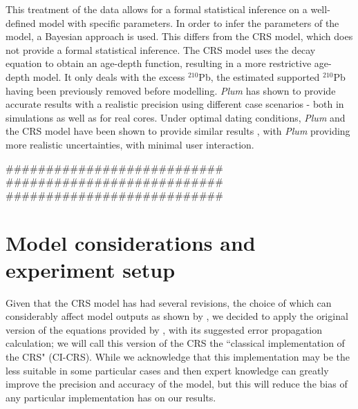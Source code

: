 \documentclass [10pt] {article}
\begin{document}
This treatment of the data allows for a formal statistical inference on a well-defined model with specific parameters. 
In order to infer the parameters of the model, a Bayesian approach is used.
This differs from the CRS model, which does not provide a formal statistical inference.
The CRS model uses the decay equation to obtain an age-depth function, resulting in a more restrictive age-depth model. 
It only deals with the excess $^{210}$Pb, the estimated supported $^{210}$Pb having been previously removed before modelling.
\textit{Plum} has shown to provide accurate results with a realistic precision using different case scenarios \citep{Aquino2018,Aquino2020} - both in simulations as well as for real cores.
Under optimal dating conditions, \textit{Plum} and the CRS model have been shown to provide similar results \citep{Aquino2020}, with \textit{Plum} providing more realistic uncertainties, with minimal user interaction. 

###########################
###########################
###########################

\section{Model considerations and experiment setup}

Given that the CRS model has had several revisions, the choice of which can considerably affect model outputs as shown by \citet{Barsanti2020}, we decided to apply the original version of the equations provided by \citet{Appleby2001}, with its suggested error propagation calculation; we will call this version of the CRS the ``classical implementation of the CRS" (CI-CRS). 
While we acknowledge that this implementation may be the less suitable in some particular cases and then expert knowledge can greatly improve the precision and accuracy of the model, but this will reduce the bias of any particular implementation has on our results.

\end{document}

